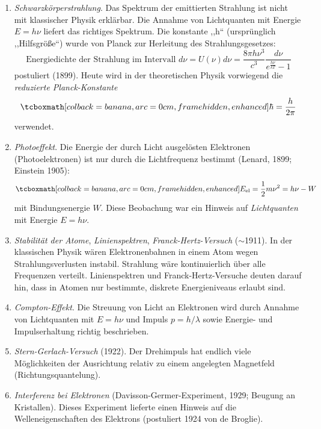 \begin{enumerate}
	\item \emph{Schwarzkörperstrahlung}. Das Spektrum der emittierten Strahlung ist nicht mit klassischer Physik erklärbar. Die Annahme von Lichtquanten mit Energie $E=h\nu$ liefert das richtiges Spektrum. Die konstante ,,h`` (ursprünglich ,,Hilfsgröße``) wurde von Planck zur Herleitung des Strahlungsgesetzes:
	\begin{equation*}
		\text{Energiedichte der Strahlung im Intervall $d\nu$} = U(\nu)d\nu = \frac{8\pi h \nu^3}{c^3}\frac{d\nu}{e^{\frac{h\nu}{kT}}-1}
	\end{equation*}
	postuliert (1899). Heute wird in der theoretischen Physik vorwiegend die \emph{reduzierte Planck-Konstante} 
	\begin{equation*}
		\eqbox{\hbar = \frac{h}{2\pi}}
	\end{equation*}
	verwendet.
	\item \emph{Photoeffekt}. Die Energie der durch Licht ausgelösten Elektronen (Photoelektronen) ist nur durch die Lichtfrequenz bestimmt (Lenard, 1899; Einstein 1905):
	\begin{equation*}
		\eqbox{E_{\text{el}} = \frac12 m\nu^2 = h\nu -W}
	\end{equation*}
	mit Bindungsenergie $W$. Diese Beobachung war ein Hinweis auf \emph{Lichtquanten} mit Energie $E=h\nu$.
	\item \emph{Stabilität der Atome}, \emph{Linienspektren}, \emph{Franck-Hertz-Versuch} ($\sim$1911). In der klassischen Physik wären Elektronenbahnen in einem Atom wegen Strahlungsverlusten instabil. Strahlung wäre kontinuierlich über alle Frequenzen verteilt. Linienspektren und Franck-Hertz-Versuche deuten darauf hin, dass in Atomen nur bestimmte, diskrete Energieniveaus erlaubt sind. 
	\item \emph{Compton-Effekt}. Die Streuung von Licht an Elektronen wird durch Annahme von Lichtquanten mit $E=h\nu$ und Impuls $p=h/\lambda$ sowie Energie- und Impulserhaltung richtig beschrieben. 
	\item \emph{Stern-Gerlach-Versuch} (1922). Der Drehimpuls hat endlich viele Möglichkeiten der Ausrichtung relativ zu einem angelegten Magnetfeld (Richtungsquantelung).
	\item \emph{Interferenz bei Elektronen} (Davisson-Germer-Experiment, 1929; Beugung an Kristallen). Dieses Experiment lieferte einen Hinweis auf die Welleneigenschaften des Elektrons (postuliert 1924 von de Broglie).
\end{enumerate}


